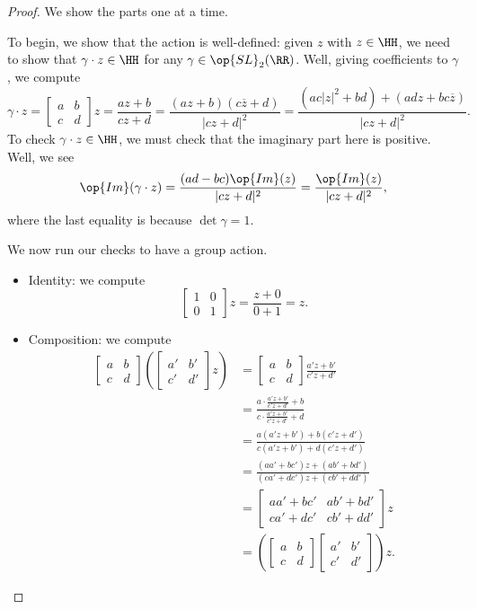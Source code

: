 \documentclass[../notes.tex]{subfiles}
\begin{document}
\begin{proof}
	We show the parts one at a time.
	\begin{listalph}
		\item To begin, we show that the action is well-defined: given $z$ with $z\in\HH$, we need to show that $\gamma\cdot z\in\HH$ for any $\gamma\in\op{SL}_2(\RR)$. Well, giving coefficients to $\gamma$, we compute
		\[\gamma\cdot z=\begin{bmatrix}
			a & b \\
			c & d
		\end{bmatrix}z=\frac{az+b}{cz+d}=\frac{(az+b)(c\overline z+d)}{|cz+d|^2}=\frac{\left(ac|z|^2+bd\right)+(adz+bc\overline z)}{|cz+d|^2}.\]
		To check $\gamma\cdot z\in\HH$, we must check that the imaginary part here is positive. Well, we see
		\[\op{Im}(\gamma\cdot z)=\frac{(ad-bc)\op{Im}(z)}{|cz+d|^2}=\frac{\op{Im}(z)}{|cz+d|^2},\]
		where the last equality is because $\det\gamma=1$.

		We now run our checks to have a group action.
		\begin{itemize}
			\item Identity: we compute
			\[\begin{bmatrix}
				1 & 0 \\
				0 & 1
			\end{bmatrix}z=\frac{z+0}{0+1}=z.\]
			\item Composition: we compute
			\begin{align*}
				\begin{bmatrix}
					a & b \\
					c & d
				\end{bmatrix}\left(\begin{bmatrix}
					a' & b' \\
					c' & d'
				\end{bmatrix}z\right) &= \begin{bmatrix}
					a & b \\
					c & d
				\end{bmatrix}\frac{a'z+b'}{c'z+d'} \\
				&= \frac{a\cdot\frac{a'z+b'}{c'z+d'}+b}{c\cdot\frac{a'z+b'}{c'z+d'}+d} \\
				&= \frac{a(a'z+b')+b(c'z+d')}{c(a'z+b')+d(c'z+d')} \\
				&= \frac{(aa'+bc')z+(ab'+bd')}{(ca'+dc')z+(cb'+dd')} \\
				&= \begin{bmatrix}
					aa'+bc' & ab'+bd' \\
					ca'+dc' & cb'+dd'
				\end{bmatrix}z \\
				&= \left(\begin{bmatrix}
					a & b \\
					c & d
				\end{bmatrix}\begin{bmatrix}
					a' & b' \\
					c' & d'
				\end{bmatrix}\right)z.
			\end{align*}
		\end{itemize}


\end{listalph}
\end{proof}
\end{document}
